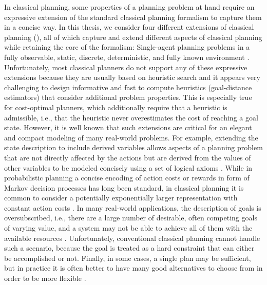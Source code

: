 In classical planning, some properties of a planning problem at hand require an expressive extension of the standard classical planning formalism to capture them in a concise way.
In this thesis, we consider four different extensions of classical planning (), all of which capture and extend different aspects of classical planning while retaining the core of the formalism: Single-agent planning problems in a fully observable, static, discrete, deterministic, and fully known environment \autocite{russell-norvig-2003}.
Unfortunately, most classical planners do not support any of these expressive extensions because they are usually based on heuristic search and it appears very challenging to design informative and fast to compute heuristics (goal-distance estimators) that consider additional problem properties.
This is especially true for cost-optimal planners, which additionally require that a heuristic is admissible, i.e., that the heuristic never overestimates the cost of reaching a goal state.
However, it is well known that such extensions are critical for an elegant and compact modeling of many real-world problems.
For example, extending the state description to include derived variables allows aspects of a planning problem that are not directly affected by the actions but are derived from the values of other variables to be modeled concisely using a set of logical axioms \autocite{thiebaux-et-al-aij2005}.
While in probabilistic planning a concise encoding of action costs or rewards in form of Markov decision processes has long been standard, in classical planning it is common to consider a potentially exponentially larger representation with constant action costs \autocite{geisser-phd2018}.
In many real-world applications, the description of goals is oversubscribed, i.e., there are a large number of desirable, often competing goals of varying value, and a system may not be able to achieve all of them with the available resources \autocite{smith-icaps2004}.
Unfortunately, conventional classical planning cannot handle such a scenario, because the goal is treated as a hard constraint that can either be accomplished or not.
Finally, in some cases, a single plan may be sufficient, but in practice it is often better to have many good alternatives to choose from in order to be more flexible \autocite{nguyen-et-al-aij2012}.

